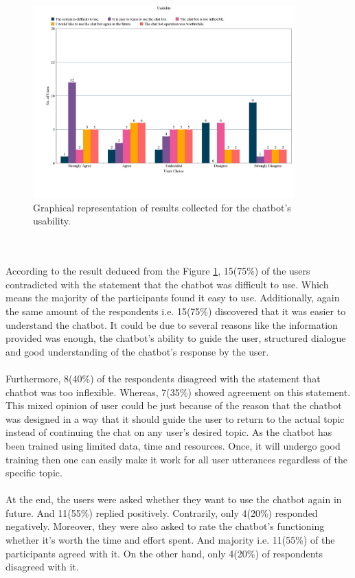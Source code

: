 \begin{figure}[!h]
    \centering
    \includegraphics[width=0.9\textwidth]{img/Usability.png}
    \caption{Graphical representation of results collected for the chatbot's usability.}
    \label{fig:usabil}
\end{figure}
\\~\\
According to the result deduced from the Figure \ref{fig:usabil}, 15(75\%) of the users contradicted with the statement that the chatbot was difficult to use. Which means the majority of the participants found it easy to use. Additionally, again the same amount of the respondents i.e. 15(75\%) discovered that it was easier to understand the chatbot. It could be due to several reasons like the information provided was enough, the chatbot's ability to guide the user, structured dialogue and good understanding of the chatbot's response by the user.
\\~\\
Furthermore, 8(40\%) of the respondents disagreed with the statement that chatbot was too inflexible. Whereas, 7(35\%) showed agreement on this statement. This mixed opinion of user could be just because of the reason that the chatbot was designed in a way that it should guide the user to return to the actual topic instead of continuing the chat on any user's desired topic. As the chatbot has been trained using limited data, time and resources. Once, it will undergo good training then one can easily make it work for all user utterances regardless of the specific topic.
\\~\\
At the end, the users were asked whether they want to use the chatbot again in future. And 11(55\%) replied positively. Contrarily, only 4(20\%) responded negatively. Moreover, they were also asked to rate the chatbot's functioning whether it's worth the time and effort spent. And majority i.e. 11(55\%) of the participants agreed with it. On the other hand, only 4(20\%) of respondents disagreed with it.

